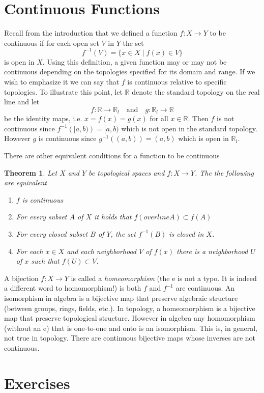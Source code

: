 \documentclass{article}
\newcommand{\R}{\mathbb{R}}
\newtheorem{theorem}{Theorem}[section]
\theoremstyle{remark}
\begin{document}
\section{Continuous Functions}
Recall from the introduction that we defined a function $f:X\to Y$ to be continuous if for each open set $V$ in $Y$ the set
$$f^{-1}(V)=\{x\in X\mid f(x)\in V\} $$
is open in $X$. Using this definition, a given function may or may not be continuous depending on the topologies specified for its domain and range. 
If we wish to emphasize it we can say that $f$ is continuous relative to specific topologies.
To illustrate this point, let $\R$ denote the standard topology on the real line and let
$$
    f:\R\to\R_l\quad\text{and}\quad g:\R_l\to\R
$$
be the identity maps, i.e. $x=f(x)=g(x)$ for all $x\in\R$.
Then $f$ is not continuous since $f^{-1}\left([a,b)\right)=[a,b)$ which is not open in the standard topology.
However $g$ is continuous since $g^{-1}\left((a,b)\right)=(a,b)$ which is open in $\R_l$.

There are other equivalent conditions for a function to be continuous
\begin{theorem}
    Let $X$ and $Y$ be topological spaces and $f:X\to Y$. The the following are equivalent
    \begin{enumerate}
        \item $f$ is continuous
        \item For every subset $A$ of $X$ it holds that $f\left(overline{A}\right)\subset\overline{f(A)}$
        \item For every closed subset $B$ of $Y$, the set $f^{-1}(B)$ is closed in $X$.
        \item For each $x\in X$ and each neighborhood $V$ of $f(x)$ there is a neighborhood $U$ of $x$ such that $f(U)\subset V$.
    \end{enumerate}
\end{theorem}

A bijection $f:X\to Y$ is called a \textit{homeomorphism} (the e is not a typo. It is indeed a different word to homomorphism!) is both $f$ and $f^{-1}$ are continuous.
An isomorphism in algebra is a bijective map that preserve algebraic structure (between groups, rings, fields, etc.).
In topology, a homeomorphism is a bijective map that preserve topological structure. However in algebra any homomorphism (without an e) that is one-to-one and onto is an isomorphism.
This is, in general, not true in topology. There are continuous bijective maps whose inverses are not continuous. 

\newpage
\section{Exercises}

    
\end{document}
